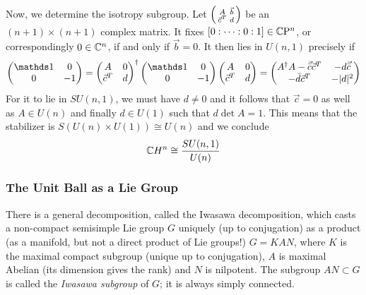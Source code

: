 \documentclass[parskip=half]{scrartcl}
\begin{document}
Now, we determine the isotropy subgroup. Let 
$\begin{psmallmatrix}
	A & \vec b \\
	\vec c^T & d
\end{psmallmatrix}$ be an $(n+1)\times (n+1)$ complex matrix. It fixes $[0:\dots:0:1]\in \mathbb{C}\mathrm{P}^n$, or correspondingly $0\in\mathbb{C}^n$, if and only if $\vec b=0$. It then lies in $U(n,1)$ precisely if 
\begin{equation*}
	\begin{pmatrix}
		\Unit & 0 \\ 0 & -1
	\end{pmatrix}
	=
	\begin{pmatrix}
		A & 0 \\ \vec c^T & d
	\end{pmatrix}^\dagger 
	\begin{pmatrix}
		\Unit & 0 \\ 0 & -1 
	\end{pmatrix}
	\begin{pmatrix}
		A & 0 \\ \vec c^T & d
	\end{pmatrix}
	=
	\begin{pmatrix}
		A^\dagger A-\vec{\bar c}\vec c^T & -d \vec{\bar c}\\
		-\bar d \vec c^T & -\abs{d}^2
	\end{pmatrix}
\end{equation*}
For it to lie in $SU(n,1)$, we must have $d\neq 0$ and it follows that $\vec c=0$ as well as $A\in U(n)$ and finally $d\in U(1)$ such that $d \det A=1$. This means that the stabilizer is $S(U(n)\times U(1))\cong U(n)$ and we conclude
\begin{equation*}
	\mathbb{C} H^n\cong \frac{SU(n,1)}{U(n)}
\end{equation*}

\subsubsection{The Unit Ball as a Lie Group}

There is a general decomposition, called the Iwasawa decomposition, which casts a non-compact semisimple Lie group $G$ uniquely (up to conjugation) as a product (as a manifold, but not a direct product of Lie groups!) $G=KAN$, where $K$ is the maximal compact subgroup (unique up to conjugation), $A$ is maximal Abelian (its dimension gives the rank) and $N$ is nilpotent. The subgroup $AN\subset G$ is called the \emph{Iwasawa subgroup} of $G$; it is always simply connected. 
\end{document}
